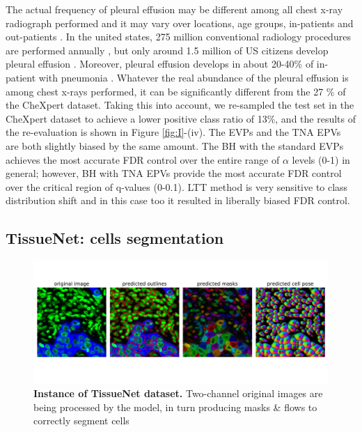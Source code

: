 \documentclass{article}
\begin{document}
The actual frequency of pleural effusion may be different among all chest x-ray radiograph performed and it may vary over locations, age groups, in-patients and out-patients \cite{Zaki2024,Cashen2017PleuralEA}. In the united states, 275 million conventional radiology procedures are performed annually \cite{mahesh2022patient}, but only around 1.5 million of US citizens develop pleural effusion \cite{Cashen2017PleuralEA}. Moreover, pleural effusion develops in about 20-40\% of in-patient with pneumonia \cite{shebl2018parapneumonic}. Whatever the real abundance of the pleural effusion is among  chest x-rays performed, it can be significantly different from the 27 \% of the CheXpert dataset. Taking this into account, we re-sampled the test set in the CheXpert dataset to achieve a lower positive class ratio of 13\%, and the results of the re-evaluation is shown in Figure \ref{fig:I}-(iv). The EVPs and the TNA EPVs are both slightly biased by the same amount. The BH with the standard EVPs achieves the most accurate FDR control over the entire range of $\alpha$ levels (0-1) in general; however, BH with TNA EPVs provide the most accurate FDR control over the critical region of q-values (0-0.1). LTT method is very sensitive to class distribution shift and in this case too it resulted in liberally biased FDR control.



\subsection{TissueNet: cells segmentation}

\begin{figure}[h!]
    \centering
	\includegraphics[width=5in]{img/tissuenet.pdf}
	\caption{{\bf Instance of TissueNet dataset.} Two-channel original images are being processed by the model, in turn producing masks \& flows to correctly segment cells}
	\label{fig:tissue_example}
\end{figure} 
\end{document}
